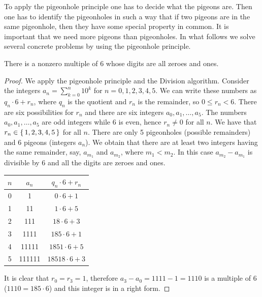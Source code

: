 To apply the pigeonhole principle one has to decide what the pigeons are. Then one has to identify the pigeonholes in such a way
that if two pigeons are in the same pigeonhole, then they have some special property in common. It is important that we need more
pigeons than pigeonholes. In what follows we solve several concrete problems by using the pigeonhole principle.
\begin{proposition}
There is a nonzero multiple of 6 whose digits are all zeroes and ones. 
\end{proposition}
\begin{proof}
We apply the pigeonhole principle and the Division algorithm. Consider the integers $a_n=\sum_{k=0}^n 10^k$ for $n=0,1,2,3,4,5$.
We can write these numbers as $q_n\cdot 6+r_n$, where $q_n$ is the quotient and $r_n$ is the remainder, so $0\leq r_n<6$. There are six
possibilities for $r_n$ and there are six integers $a_0,a_1,\ldots,a_5$. The numbers $a_0,a_1,\ldots,a_5$ are odd integers while 6 is even,
hence $r_n\neq 0$ for all $n$. We have that $r_n\in\left\{\,1,2,3,4,5\,\right\}$ for all $n$. There are only 5 pigeonholes (possible remainders) and 6 pigeons (integers $a_n$).
We obtain that there are at least two integers having the same remainder, say, $a_{m_1}$ and $a_{m_2}$, where $m_1<m_2$. In this case $a_{m_2}-a_{m_1}$ is
divisible by 6 and all the digits are zeroes and ones.
\begin{center}
\begin{tabular}{|c|c|c|}
\hline
$n$ & $a_n$ & $q_n\cdot 6+r_n$\\
\hline
0 & 1&$0\cdot 6+1$\\
\hline
1 &11& $1\cdot 6+5$\\
\hline
2 &111&$18\cdot 6+3$\\
\hline
3 &1111&$185\cdot 6+1$\\
\hline
4 &11111&$1851\cdot 6+5$\\
\hline
5 & 111111 & $18518\cdot 6+3$\\
\hline
\end{tabular}
\end{center}
It is clear that $r_0=r_3=1$, therefore $a_3-a_0=1111-1=1110$ is a multiple of 6 ($1110=185\cdot 6$) and this integer is in a right form.
\end{proof} 

